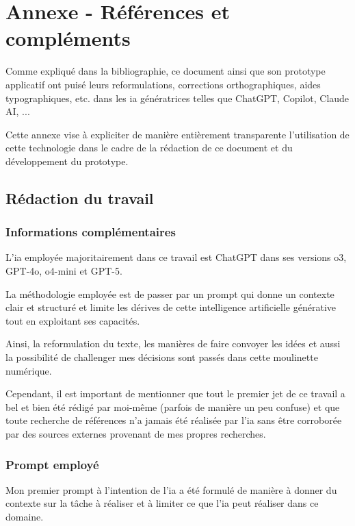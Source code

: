\section{Annexe - Références et compléments} \label{sec:annexes_d}
Comme expliqué dans la bibliographie, ce document ainsi que son prototype applicatif ont puisé leurs reformulations, corrections orthographiques, aides typographiques, etc. dans les \acrshort{ia} génératrices telles que ChatGPT, Copilot, Claude AI, ...

Cette annexe vise à expliciter de manière entièrement transparente l'utilisation de cette technologie dans le cadre de la rédaction de ce document et du développement du prototype.

\subsection{Rédaction du travail}
\subsubsection{Informations complémentaires}
L'\acrfull{ia} employée majoritairement dans ce travail est ChatGPT dans ses versions o3, GPT-4o, o4-mini et GPT-5.

La méthodologie employée est de passer par un prompt qui donne un contexte clair et structuré et limite les dérives de cette intelligence artificielle générative tout en exploitant ses capacités.

Ainsi, la reformulation du texte, les manières de faire convoyer les idées et aussi la possibilité de challenger mes décisions sont passés dans cette moulinette numérique.

Cependant, il est important de mentionner que tout le premier jet de ce travail a bel et bien été rédigé par moi-même (parfois de manière un peu confuse) et que toute recherche de références n'a jamais été réalisée par l'\acrshort{ia} sans être corroborée par des sources externes provenant de mes propres recherches.

\subsubsection{Prompt employé}
Mon premier prompt à l'intention de l'\acrshort{ia} a été formulé de manière à donner du contexte sur la tâche à réaliser et à limiter ce que l'\acrshort{ia} peut réaliser dans ce domaine.

